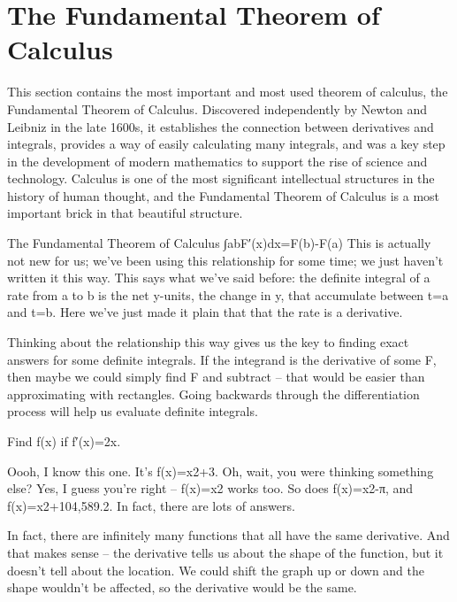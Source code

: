\section{The Fundamental Theorem of Calculus}
\label{sec:fund-theorem}
This section contains the most important and most used theorem of calculus, the Fundamental Theorem of Calculus. Discovered independently by Newton and Leibniz in the late 1600s, it establishes the connection between derivatives and integrals, provides a way of easily calculating many integrals, and was a key step in the development of modern mathematics to support the rise of science and technology. Calculus is one of the most significant intellectual structures in the history of human thought, and the Fundamental Theorem of Calculus is a most important brick in that beautiful structure.

The Fundamental Theorem of Calculus
∫abF′(x)dx=F(b)-F(a)
This is actually not new for us; we've been using this relationship for some time; we just haven’t written it this way. This says what we've said before: the definite integral of a rate from a to b is the net y-units, the change in y, that accumulate between t=a and t=b. Here we’ve just made it plain that that the rate is a derivative.

Thinking about the relationship this way gives us the key to finding exact answers for some definite integrals. If the integrand is the derivative of some F, then maybe we could simply find F and subtract – that would be easier than approximating with rectangles. Going backwards through the differentiation process will help us evaluate definite integrals.

\begin{example}
Find f(x) if f′(x)=2x.

\begin{solution}
Oooh, I know this one. It's f(x)=x2+3. Oh, wait, you were thinking something else? Yes, I guess you're right – f(x)=x2 works too. So does f(x)=x2-π, and f(x)=x2+104,589.2. In fact, there are lots of answers.
\end{solution}\end{example}

In fact, there are infinitely many functions that all have the same derivative. And that makes sense – the derivative tells us about the shape of the function, but it doesn't tell about the location. We could shift the graph up or down and the shape wouldn't be affected, so the derivative would be the same.

